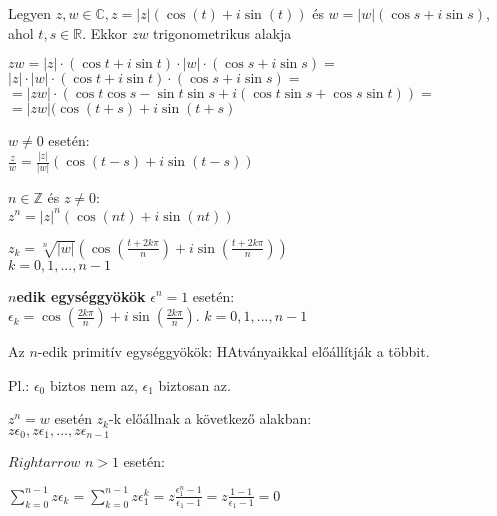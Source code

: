 \begin{frame}
\begin{tcolorbox}[title={Def.: Moivre azonosságok}]
Legyen $z, w \in \mathbb{C}, z = |z|({\cos}(t) + i{\sin}(t))$ és $w = |w|({\cos}s + i {\sin}s)$, ahol $t, s \in \mathbb{R}$. Ekkor $zw$ trigonometrikus alakja\\
\mbigskip

$zw = |z| \cdot ({\cos}t + i{\sin}t) \cdot |w| \cdot ({\cos}s + i{\sin}s) =$\\
$|z| \cdot |w| \cdot ({\cos}t + i{\sin}t) \cdot ({\cos}s + i{\sin}s) =$\\
$= |zw| \cdot ({\cos}t{\cos}s - {\sin}t{\sin}s + i({\cos}t{\sin}s + {\cos}s{\sin}t)) =$\\
$= |zw|({\cos}(t + s) + i{\sin}(t + s)$\\
\mbigskip

$w \neq 0$ esetén:\\
$\frac{z}{w} = \frac{|z|}{|w|}({\cos}(t - s) + i {\sin}(t - s))$\\
\mbigskip

$n \in \mathbb{Z}$ és $z \neq 0$:\\
$z^n = |z|^n({\cos}(nt) + i{\sin}(nt))$
\end{tcolorbox}

\begin{tcolorbox}[title={Def.: Gyökvonás komplex számokból}]
$z_k = \sqrt[n]{|w|}({\cos}(\frac{t + 2k{\pi}}{n}) + i{\sin}(\frac{t + 2k{\pi}}{n}))$\\
$k = 0, 1, ..., n - 1$\\
\mbigskip

\textbf{$n$edik egységgyökök} ${\epsilon}^n = 1$ esetén:\\
${\epsilon}_k = {\cos}(\frac{2k{\pi}}{n}) + i{\sin}(\frac{2k{\pi}}{n})$. $k = 0, 1, ..., n - 1$
\end{tcolorbox}
\end{frame}

\begin{frame}
\begin{tcolorbox}[title={Def.: $n$-edik primitív egységgyökök}]
Az $n$-edik primitív egységgyökök: HAtványaikkal előállítják a többit.\\
\mmedskip

Pl.: ${\epsilon}_0$ biztos nem az, ${\epsilon}_1$ biztosan az.\\
\mmedskip

$z^n = w$ esetén $z_k$-k előállnak a következő alakban:\\
$z{\epsilon}_0, z{\epsilon}_1, ..., z{\epsilon}_{n - 1}$\\
\mmedskip

$Rightarrow$ $n > 1$ esetén:\\
\mmedskip

$\sum_{k = 0}^{n - 1} z{\epsilon}_k = \sum_{k = 0}^{n - 1} z{\epsilon}^k_1 = z\frac{{\epsilon}_1^n - 1}{{\epsilon}_1 - 1} = z\frac{1 - 1}{{\epsilon}_1 - 1} = 0$
\end{tcolorbox}
\end{frame}

